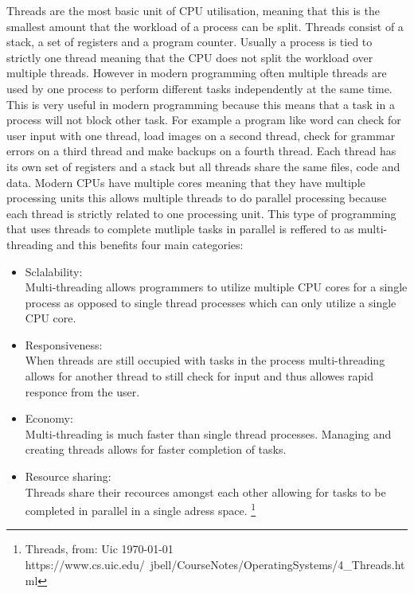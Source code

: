 Threads are the most basic unit of CPU utilisation, meaning that this is the smallest amount that the workload of a 
process can be split. Threads consist of a stack, a set of registers and a program counter. Usually a process
is tied to strictly one thread meaning that the CPU does not split the workload over multiple threads. However in
modern programming often multiple threads are used by one process to perform different tasks independently at the
same time. This is very useful in modern programming because this means that a task in a process will not block 
other task. For example a program like word can check for user input with one thread, load images on a second thread,
check for grammar errors on a third thread and make backups on a fourth thread. Each thread has its own set of registers
and a stack but all threads share the same files, code and data. Modern CPUs have multiple cores meaning that they have
multiple processing units this allows multiple threads to do parallel processing because each thread is strictly
related to one processing unit. This type of programming that uses threads to complete mutliple tasks
in parallel is reffered to as multi-threading and this benefits four main categories:


\begin{itemize}
\item Sclalability: \\

Multi-threading allows programmers to utilize multiple CPU cores for a single process as opposed to single
thread processes which can only utilize a single CPU core.

\item Responsiveness: \\

When threads are still occupied with tasks in the process multi-threading allows for another thread
to still check for input and thus allowes rapid responce from the user.

\item Economy: \\

Multi-threading is much faster than single thread processes. Managing and creating threads allows for
faster completion of tasks.

\item Resource sharing: \\

Threads share their recources amongst each other allowing for tasks to be completed in parallel in a
single adress space. \footnote{Threads, from: Uic \today \\ https://www.cs.uic.edu/~jbell/CourseNotes/OperatingSystems/4_Threads.html }

\end{itemize}

